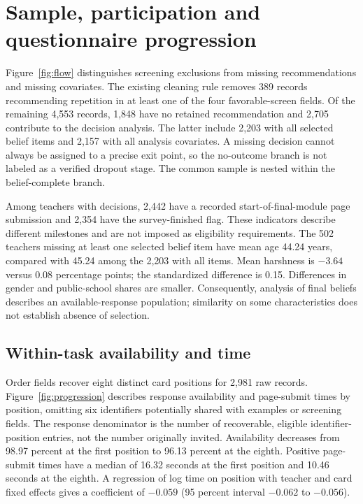 \section{Sample, participation and questionnaire progression}\label{app:sample}
Figure~\ref{fig:flow} distinguishes screening exclusions from missing recommendations and missing covariates. The existing cleaning rule removes 389 records recommending repetition in at least one of the four favorable-screen fields. Of the remaining 4,553 records, 1,848 have no retained recommendation and 2,705 contribute to the decision analysis. The latter include 2,203 with all selected belief items and 2,157 with all analysis covariates. A missing decision cannot always be assigned to a precise exit point, so the no-outcome branch is not labeled as a verified dropout stage. The common sample is nested within the belief-complete branch.

Among teachers with decisions, 2,442 have a recorded start-of-final-module page submission and 2,354 have the survey-finished flag. These indicators describe different milestones and are not imposed as eligibility requirements. The 502 teachers missing at least one selected belief item have mean age 44.24 years, compared with 45.24 among the 2,203 with all items. Mean harshness is $-3.64$ versus 0.08 percentage points; the standardized difference is 0.15. Differences in gender and public-school shares are smaller. Consequently, analysis of final beliefs describes an available-response population; similarity on some characteristics does not establish absence of selection.

\subsection{Within-task availability and time}
Order fields recover eight distinct card positions for 2,981 raw records. Figure~\ref{fig:progression} describes response availability and page-submit times by position, omitting six identifiers potentially shared with examples or screening fields. The response denominator is the number of recoverable, eligible identifier-position entries, not the number originally invited. Availability decreases from 98.97 percent at the first position to 96.13 percent at the eighth. Positive page-submit times have a median of 16.32 seconds at the first position and 10.46 seconds at the eighth. A regression of log time on position with teacher and card fixed effects gives a coefficient of $-0.059$ (95 percent interval $-0.062$ to $-0.056$).

